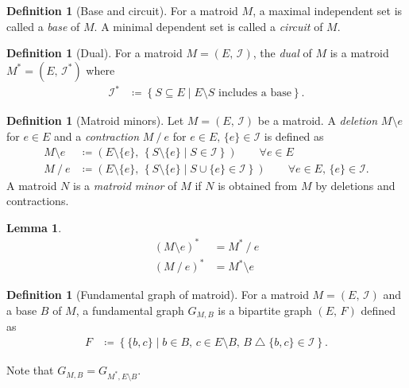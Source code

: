 \documentclass[twoside,10pt]{article}
\newtheorem{lemma}[theorem]{Lemma}
\theoremstyle{definition}
\newtheorem{definition}[theorem]{Definition}
\theoremstyle{remark}
\begin{document}
\begin{definition}[Base and circuit]
For a matroid $M$, a maximal independent set is called a \textit{base} of $M$.
A minimal dependent set is called a \textit{circuit} of $M$.
\end{definition}

\begin{definition}[Dual]
For a matroid $M=(E,\,\mathcal{I})$, the \textit{dual} of $M$ is a matroid $M^*=(E,\,\mathcal{I}^*)$ where
\begin{align*}
\mathcal{I}^*&\coloneqq\left\{S\subseteq E\mid \text{$E\setminus S$ includes a base}\right\}.
\end{align*}
\end{definition}

\begin{definition}[Matroid minors]
Let $M=(E,\,\mathcal{I})$ be a matroid.
A \textit{deletion} $M\setminus e$ for $e\in E$ and a \textit{contraction} $M\mathbin{/} e$ for $e\in E,\, \{e\}\in\mathcal{I}$ is defined as 
\begin{align*}
M\setminus e&\coloneqq \left(E\setminus\{e\},\, \left\{S\setminus\{e\}\mid S\in\mathcal{I}\right\}\right)\qquad\forall e\in E\\
M\mathbin{/} e&\coloneqq \left(E\setminus\{e\},\, \left\{S\setminus\{e\}\mid S\cup\{e\}\in\mathcal{I}\right\}\right)\qquad\forall e\in E,\, \{e\}\in\mathcal{I}.
\end{align*}
A matroid $N$ is a \textit{matroid minor} of $M$ if $N$ is obtained from $M$ by deletions and contractions.
\end{definition}

\begin{lemma}
\begin{align*}
(M\setminus e)^* &= M^*\mathbin{/}e\\
(M\mathbin{/} e)^* &= M^*\setminus e
\end{align*}
\end{lemma}

\begin{definition}[Fundamental graph of matroid]
For a matroid $M=(E,\,\mathcal{I})$ and a base $B$ of $M$,
a fundamental graph $G_{M,B}$ is a bipartite graph $(E,\, F)$ defined as
\begin{align*}
F&\coloneqq\left\{\{b,c\} \mid b\in B,\, c\in E\setminus B,\, B\bigtriangleup\{b,c\}\in\mathcal{I}\right\}.
\end{align*}
\end{definition}
Note that $G_{M,B}=G_{M^*,E\setminus B}$.
\end{document}

